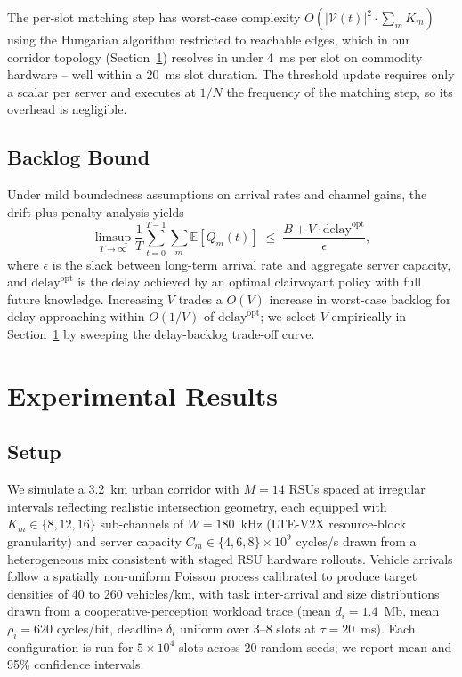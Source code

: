\documentclass[journal,10pt]{IEEEtran}
\begin{document}
The per-slot matching step has worst-case complexity $O(|\mathcal{V}(t)|^2 \cdot \sum_m K_m)$ using the Hungarian algorithm restricted to reachable edges, which in our corridor topology (Section~\ref{sec:results}) resolves in under 4~ms per slot on commodity hardware -- well within a 20~ms slot duration. The threshold update requires only a scalar per server and executes at $1/N$ the frequency of the matching step, so its overhead is negligible.

\subsection{Backlog Bound}
Under mild boundedness assumptions on arrival rates and channel gains, the drift-plus-penalty analysis yields
\begin{equation}
\limsup_{T\to\infty} \frac{1}{T}\sum_{t=0}^{T-1}\sum_m \mathbb{E}[Q_m(t)] \;\le\; \frac{B + V \cdot \text{delay}^{\text{opt}}}{\epsilon},
\label{eq:bound}
\end{equation}
where $\epsilon$ is the slack between long-term arrival rate and aggregate server capacity, and $\text{delay}^{\text{opt}}$ is the delay achieved by an optimal clairvoyant policy with full future knowledge. Increasing $V$ trades a $O(V)$ increase in worst-case backlog for delay approaching within $O(1/V)$ of $\text{delay}^{\text{opt}}$; we select $V$ empirically in Section~\ref{sec:results} by sweeping the delay-backlog trade-off curve.

\section{Experimental Results}
\label{sec:results}

\subsection{Setup}
We simulate a 3.2~km urban corridor with $M = 14$ RSUs spaced at irregular intervals reflecting realistic intersection geometry, each equipped with $K_m \in \{8,12,16\}$ sub-channels of $W = 180$~kHz (LTE-V2X resource-block granularity) and server capacity $C_m \in \{4,6,8\}\times10^{9}$ cycles/s drawn from a heterogeneous mix consistent with staged RSU hardware rollouts. Vehicle arrivals follow a spatially non-uniform Poisson process calibrated to produce target densities of 40 to 260 vehicles/km, with task inter-arrival and size distributions drawn from a cooperative-perception workload trace (mean $d_i = 1.4$~Mb, mean $\rho_i = 620$ cycles/bit, deadline $\delta_i$ uniform over 3--8 slots at $\tau = 20$~ms). Each configuration is run for $5\times10^4$ slots across 20 random seeds; we report mean and 95\% confidence intervals.
\end{document}
